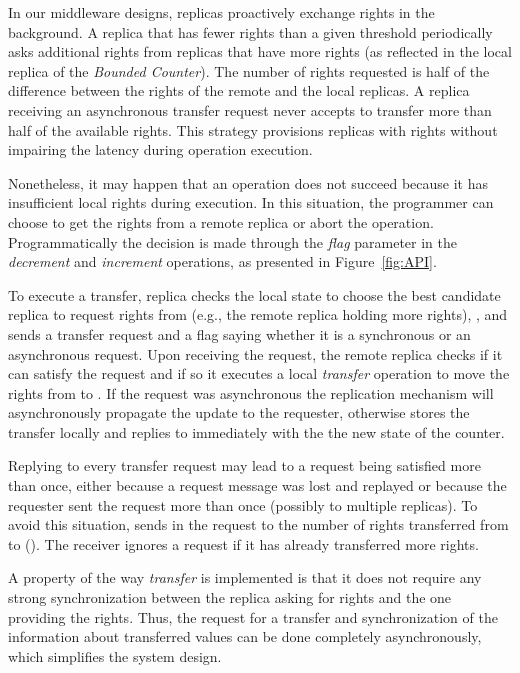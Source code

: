 \documentclass[conference]{IEEEtran}
\newcommand{\InvCounter}{\emph{Bounded Counter}}
\begin{document}
In our middleware designs, replicas proactively exchange 
rights in the background.
A replica that has fewer rights than a given threshold periodically asks
additional rights from replicas that have more rights
(as reflected in the local replica of the \InvCounter{}).
The number of rights requested is half of the difference between the rights 
of the remote and the local replicas.
A replica receiving an asynchronous transfer request never accepts to transfer 
more than half of the available rights.
This strategy provisions replicas with rights without impairing the latency 
during operation execution.

Nonetheless, it may happen that an operation does not succeed because it has insufficient
local rights during execution.
In this situation, the programmer can choose to get the rights from a remote replica
or abort the operation.
Programmatically the decision is made through the \emph{flag} parameter 
in the \emph{decrement} and \emph{increment} operations, as presented in Figure~\ref{fig:API}.

To execute a transfer, replica  checks the local state
to choose the best candidate replica to request rights from (e.g., the remote replica holding more rights), 
, and sends a transfer request and a flag saying whether it is a synchronous or an asynchronous request.
Upon receiving the request, the remote replica  checks if it can satisfy the request
and if so it executes a local \emph{transfer} operation to move
the rights from  to . 
If the request was asynchronous the replication 
mechanism will asynchronously propagate the update to the requester, 
otherwise  stores the transfer locally and replies to  
immediately with the the new state of the counter.

Replying to every transfer request may lead to a request being satisfied more 
than once, either because a request message was lost and replayed or because the 
requester sent the request more than once (possibly to multiple replicas).
To avoid this situation,  sends in the request to  the number 
of rights transferred from  to  ().
The receiver ignores a request if it has already transferred more rights.

A property of the way \emph{transfer} is implemented is that it does not 
require any strong synchronization between the replica asking for rights and 
the one providing the rights. 
Thus, the request for a transfer and synchronization of the information 
about transferred values can be done completely asynchronously, 
which simplifies the system design. 
\end{document}

